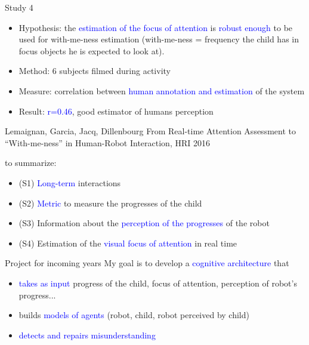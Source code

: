 \documentclass[compress]{beamer}
\renewcommand{\bf}{\Medium}
\begin{document}
\begin{frame}{Study 4}
    \begin{itemize}
    \item {\bf Hypothesis}: the \textcolor{blue}{estimation of the focus of attention} is \textcolor{blue}{robust enough} to be used for {\bf with-me-ness} estimation (with-me-ness = frequency the child has in focus objects he is expected to look at).
    \item {\bf Method}: 6 subjects filmed during activity
    \item {\bf Measure}: correlation between \textcolor{blue}{human annotation and estimation} of the system
    \item {\bf Result}: \textcolor{blue}{r=0.46}, good estimator of humans perception\\
    \end{itemize}
    
\tiny{Lemaignan, Garcia, Jacq, Dillenbourg {\bf From Real-time Attention Assessment to “With-me-ness” in Human-Robot Interaction}, HRI 2016}
\end{frame}

\begin{frame}

{\bf to summarize}:
\begin{itemize}
\item (S1) \textcolor{blue}{Long-term} interactions
\item (S2) \textcolor{blue}{Metric} to measure the progresses of the child
\item (S3) Information about the \textcolor{blue}{perception of the progresses} of the robot %
\item (S4) Estimation of the \textcolor{blue}{visual focus of attention} in real time
\end{itemize}
\end{frame}

\begin{frame}{Project for incoming years}
My goal is to develop a \textcolor{blue}{cognitive architecture} that 
\begin{itemize}
\item \textcolor{blue}{takes as input} progress of the child, focus of attention, perception of robot's progress...
\item builds \textcolor{blue}{models of agents} (robot, child, robot perceived by child) 
\item \textcolor{blue}{detects and repairs misunderstanding}
\end{itemize}
\end{frame}
\end{document}
